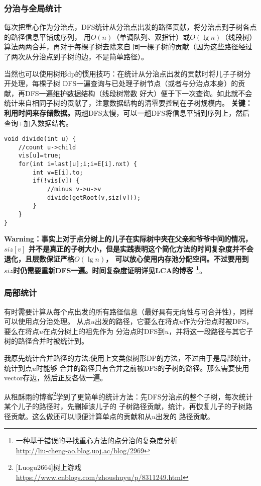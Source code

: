 \subsubsection{分治与全局统计}
每次把重心作为分治点，DFS统计从分治点出发的路径贡献，将分治点到子树各点的路径信息平铺成序列，
用$O(n)$（单调队列、双指针）或$O(\lg n)$（线段树）算法两两合并，再对于每棵子树去除来自
同一棵子树的贡献（因为这些路径经过了两次从分治点到子树的边，不是简单路径）。

当然也可以使用树形dp的惯用技巧：在统计从分治点出发的贡献时将儿子子树分开处理，每棵子树
DFS一遍查询与已处理子树节点（或者与分治点本身）的贡献，再DFS一遍维护数据结构（线段树常数
好大）便于下一次查询。如此就不会统计来自相同子树的贡献了，注意数据结构的清零要控制在子树规模内。
{\bfseries 关键：利用时间来存储数据。}两趟DFS太慢，可以一趟DFS将信息平铺到序列上，然后
查询+加入数据结构。

\begin{lstlisting}[title=divide]
void divide(int u) {
    //count u->child
    vis[u]=true;
    for(int i=last[u];i;i=E[i].nxt) {
        int v=E[i].to;
        if(!vis[v]) {
            //minus v->u->v
            divide(getRoot(v,siz[v]));
        }
    }
}
\end{lstlisting}

{\bfseries Warning：事实上对于点分树上的儿子在实际树中夹在父亲和爷爷中间的情况，$siz[v]$
并不是真正的子树大小，但是实践表明这个简化方法的时间复杂度并不会退化，且层数保证严格$O(\lg n)$，
可以放心使用内存池分配空间。不过要用到$siz$时仍需要重新DFS一遍。时间复杂度证明详见LCA的博客
\footnote{一种基于错误的寻找重心方法的点分治的复杂度分析\\
    \url{http://liu-cheng-ao.blog.uoj.ac/blog/2969}}}。
\subsubsection{局部统计}
有时需要计算从每个点出发的所有路径信息（最好具有无向性与可合并性），同样可以使用点分治处理。
从点$u$出发的路径，它要么在将点$u$作为分治点时被DFS，要么在将点$u$在点分树上的祖先作为
分治点时DFS到$u$，并将这一段路径与其它子树的路径合并时被统计到。

我原先统计合并路径的方法:使用上文类似树形DP的方法，不过由于是局部统计，统计到点$u$时能够
合并的路径只有合并之前被DFS的子树的路径。那么需要使用vector存边，然后正反各做一遍。

从租酥雨的博客\footnote{
    [Luogu2664]树上游戏\\
    \url{https://www.cnblogs.com/zhoushuyu/p/8311249.html}
}学到了更简单的统计方法：先DFS分治点的整个子树，每次统计某个儿子的路径时，先删掉该儿子的
子树路径贡献，统计，再恢复儿子的子树路径贡献。这么做还可以顺便计算单点的贡献和从$u$出发的
路径贡献。
